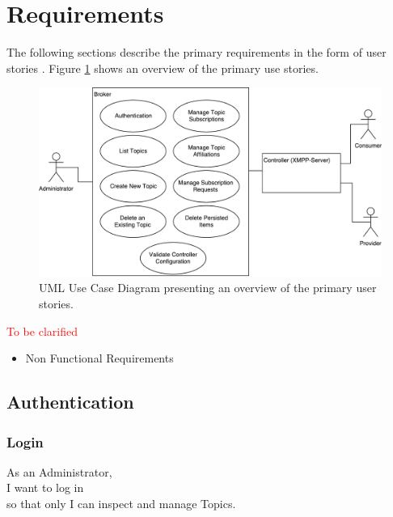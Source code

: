 
\section{Requirements}\label{sec:requirements}

The following sections describe the primary requirements in the form of user stories \cite{agile-alliance-user-stories}.
Figure \ref{fig:requirements-overview} shows an overview of the primary use stories.

\begin{figure}[h]
    \centering
    \includegraphics[width=1\linewidth]{resources/requirements_overview}
    \caption{UML Use Case Diagram presenting an overview of the primary user stories.}
    \label{fig:requirements-overview}
\end{figure}

\noindent\textcolor{red}{To be clarified}

\begin{itemize}
    \item Non Functional Requirements
\end{itemize}


\subsection{Authentication}
\subsubsection{Login}

As an Administrator,\\
I want to log in\\
so that only I can inspect and manage Topics.\\

